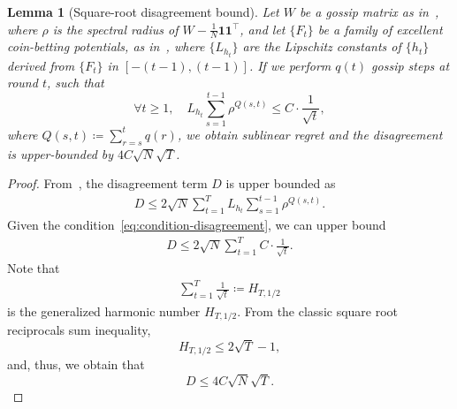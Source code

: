 \documentclass[journal]{IEEEtran} %
\newtheorem{lemma}{Lemma}
\begin{document}
\begin{lemma}[Square-root disagreement bound]\label{lemma:square-root-disagreement}
    Let $W$ be a gossip matrix as in~, where $\rho$ is the spectral radius of $W - \frac{1}{N} \mathbf{1} \mathbf{1}^\top$, and let
    $\{F_t\}$ be a family of excellent coin-betting potentials, as in~, where $\{L_{h_t}\}$ are the Lipschitz constants of $\{h_t\}$ derived from $\{F_t\}$ in $[-(t-1), (t-1)]$.
    If we perform $q(t)$ gossip steps at round $t$, such that
    \begin{equation}\label{eq:condition-disagreement}
        \forall t \geq 1, \quad L_{h_t} \sum_{s=1}^{t-1} \rho^{Q(s,t)} \leq C \cdot \frac{1}{\sqrt{t}},
    \end{equation}
    where $Q(s,t) \coloneqq \sum_{r=s}^t q(r)$, we obtain sublinear regret and the disagreement is upper-bounded by $4 C \sqrt{N} \sqrt{T}$.
\end{lemma}
\begin{proof}
    From~, the disagreement term $D$ is upper bounded as
    \begin{align}
        D \leq 2\sqrt{N} \sum_{t=1}^T L_{h_t} \sum_{s=1}^{t-1} \rho^{Q(s,t)}.
    \end{align}
    Given the condition~\eqref{eq:condition-disagreement}, we can upper bound
    \begin{align}
        D \leq 2\sqrt{N} \sum_{t=1}^T C \cdot \frac{1}{\sqrt{t}}.
    \end{align}
    Note that
    \begin{align}
        \sum_{t=1}^T \frac{1}{\sqrt{t}} \coloneqq H_{T,1/2}
    \end{align}
    is the generalized harmonic number $H_{T,1/2}$.
    From the classic square root reciprocals sum inequality,
    \begin{equation}
        H_{T,1/2} \leq 2 \sqrt{T} - 1,
    \end{equation}
    and, thus, we obtain that
    \begin{equation}
        D \leq 4 C \sqrt{N} \sqrt{T}.
    \end{equation}
\end{proof}
\end{document}
